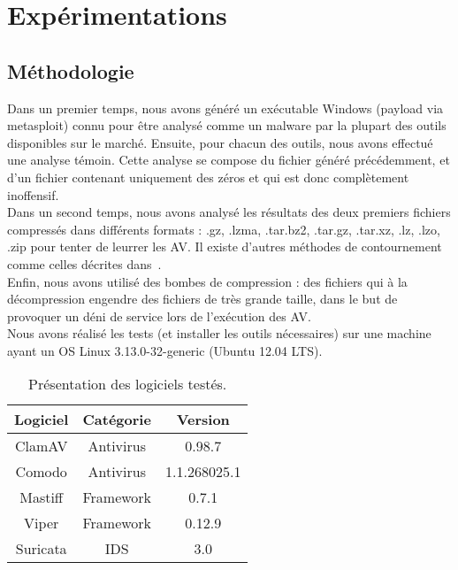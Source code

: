 \documentclass[smallextended]{svjour3}       %
\begin{document}
\section{Expérimentations}
\label{3.expérimentations}

\subsection{Méthodologie}
\label{3.1méthodologie}
Dans un premier temps, nous avons généré un exécutable Windows (payload via metasploit) connu pour être analysé comme un malware par la plupart des outils disponibles sur le marché. Ensuite, pour chacun des outils, nous avons effectué une analyse témoin. Cette analyse se compose du fichier généré précédemment, et d'un fichier contenant uniquement des zéros et qui est donc complètement inoffensif.\\
Dans un second temps, nous avons analysé les résultats des deux premiers fichiers compressés dans différents formats : .gz, .lzma, .tar.bz2, .tar.gz, .tar.xz, .lz, .lzo, .zip pour tenter de leurrer les AV. Il existe d'autres méthodes de contournement comme celles décrites dans~\cite{Contournement}.\\
Enfin, nous avons utilisé des bombes de compression : des fichiers qui à la décompression engendre des fichiers de très grande taille, dans le but de provoquer un déni de service lors de l'exécution des AV.\\
$ $\\
Nous avons réalisé les tests (et installer les outils nécessaires) sur une machine ayant un OS Linux 3.13.0-32-generic (Ubuntu 12.04 LTS).
\begin{table}[ht!]
	\begin{center}
		\begin{normalsize}
			\begin{tabular}{|c|c|c|}
    				\hline
     			\textbf{Logiciel} & \textbf{Catégorie} & \textbf{Version}\\
    				\hline
    				ClamAV & Antivirus & 0.98.7\\ 			
    				\hline
    				Comodo & Antivirus & 1.1.268025.1\\
    				\hline
    				\hline
    				Mastiff & Framework & 0.7.1\\
    				\hline
    				Viper & Framework & 0.12.9\\
    				\hline
    				\hline
    				Suricata & IDS & 3.0\\
    				\hline
 			\end{tabular}
 		\end{normalsize}
	\end{center}
	\caption{Présentation des logiciels testés.}
\end{table}
\end{document}
